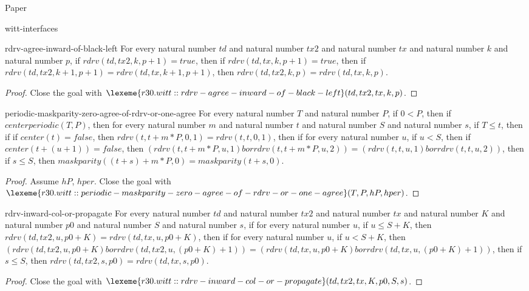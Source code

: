 \begin{lexlean}{Paper}
\begin{section}{witt-interfaces}
  \begin{theorem}{rdrv-agree-inward-of-black-left}
  For every natural number \(td\) and natural number \(tx2\) and natural number \(tx\) and natural number \(k\) and natural number \(p\), if \(rdrv(td, tx2, k, p + 1) = true\), then if \(rdrv(td, tx, k, p + 1) = true\), then if \(rdrv(td, tx2, k + 1, p + 1) = rdrv(td, tx, k + 1, p + 1)\), then \(rdrv(td, tx2, k, p) = rdrv(td, tx, k, p)\).
  \begin{proof}
  Close the goal with \(\lexeme{r30.witt::rdrv-agree-inward-of-black-left}(td, tx2, tx, k, p)\).
  \end{proof}
  \end{theorem}

  \begin{theorem}{periodic-maskparity-zero-agree-of-rdrv-or-one-agree}
  For every natural number \(T\) and natural number \(P\), if \(0 < P\), then if \(centerperiodic(T, P)\), then for every natural number \(m\) and natural number \(t\) and natural number \(S\) and natural number \(s\), if \(T ≤ t\), then if if \(center(t) = false\), then \(rdrv(t, t + m * P, 0, 1) = rdrv(t, t, 0, 1)\), then if for every natural number \(u\), if \(u < S\), then if \(center(t + (u + 1)) = false\), then \((rdrv(t, t + m * P, u, 1) bor rdrv(t, t + m * P, u, 2)) = (rdrv(t, t, u, 1) bor rdrv(t, t, u, 2))\), then if \(s ≤ S\), then \(maskparity((t + s) + m * P, 0) = maskparity(t + s, 0)\).
  \begin{proof}
  Assume \(hP\), \(hper\).
  Close the goal with \(\lexeme{r30.witt::periodic-maskparity-zero-agree-of-rdrv-or-one-agree}(T, P, hP, hper)\).
  \end{proof}
  \end{theorem}

  \begin{theorem}{rdrv-inward-col-or-propagate}
  For every natural number \(td\) and natural number \(tx2\) and natural number \(tx\) and natural number \(K\) and natural number \(p0\) and natural number \(S\) and natural number \(s\), if for every natural number \(u\), if \(u ≤ S + K\), then \(rdrv(td, tx2, u, p0 + K) = rdrv(td, tx, u, p0 + K)\), then if for every natural number \(u\), if \(u < S + K\), then \((rdrv(td, tx2, u, p0 + K) bor rdrv(td, tx2, u, (p0 + K) + 1)) = (rdrv(td, tx, u, p0 + K) bor rdrv(td, tx, u, (p0 + K) + 1))\), then if \(s ≤ S\), then \(rdrv(td, tx2, s, p0) = rdrv(td, tx, s, p0)\).
  \begin{proof}
  Close the goal with \(\lexeme{r30.witt::rdrv-inward-col-or-propagate}(td, tx2, tx, K, p0, S, s)\).
  \end{proof}
  \end{theorem}


\end{section}
\end{lexlean}
